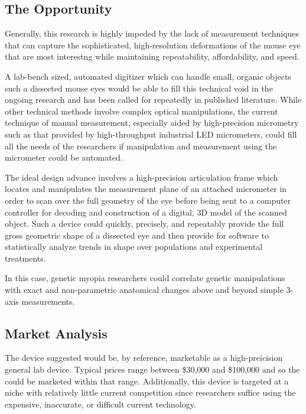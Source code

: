 \documentclass{article}
\begin{document}
\subsection{The Opportunity}
\label{sec:opportunity}

Generally, this research is highly impeded by the lack of measurement
techniques that can capture the sophisticated, high-resolution
deformations of the mouse eye that are most interestng while
maintaining repeatability, affordability, and speed.

A lab-bench sized, automated digitizer which can handle small, organic
objects such a dissected mouse eyes would be able to fill this
technical void in the ongoing research and has been called for
repeatedly in published
literature\cite{schaeffel04,atchison04,zhou99:genes}. While other
technical methods involve complex optical manipulations, the current
technique of manual measurement, especially aided by high-precision
micrometry such as that provided by high-throughput industrial LED
micrometers, could fill all the needs of the researchers if
manipulation and measurement using the micrometer could be automated.

The ideal design advance involves a high-precision articulation frame
which locates and manipulates the measurement plane of an attached
micrometer in order to scan over the full geometry of the eye before
being sent to a computer controller for decoding and construction of a
digital, 3D model of the scanned object. Such a device could quickly,
precisely, and repeatably provide the full gross geometric shape of a
dissected eye and then provide for software to statistically analyze
trends in shape over populations and experimental treatments.

In this case, genetic myopia researchers could correlate genetic
manipulations with exact and non-parametric anatomical changes above
and beyond simple 3-axis measurements.

\subsection{Market Analysis}
\label{sec:market-analysis}

The device suggested would be, by reference, marketable as a
high-preicision general lab device. Typical prices range between
\$30,000 and \$100,000 and so the could be marketed within that
range. Additionally, this device is targeted at a niche with
relatively little current competition since researchers suffice using
the expensive, inaccurate, or difficult current technology.
\end{document}
